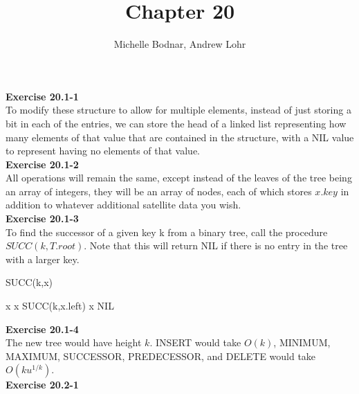 \documentclass{article}
\title{Chapter 20}
\author{Michelle Bodnar, Andrew Lohr}
\begin{document}
\maketitle


\noindent\textbf{Exercise 20.1-1}\\

To modify these structure to allow for multiple elements, instead of just storing a bit in each of the entries, we can store the head of a linked list representing how many elements of that value that are contained in the structure, with a NIL value to represent having no elements of that value.\\

\noindent\textbf{Exercise 20.1-2}\\

All operations will remain the same, except instead of the leaves of the tree being an array of integers, they will be an array of nodes, each of which stores $x.key$ in addition to whatever additional satellite data you wish.  \\


\noindent\textbf{Exercise 20.1-3}\\

To find the successor of a given key k from a binary tree, call the procedure $SUCC(k, T.root)$. Note that this will return NIL if there is no entry in the tree with a larger key.\\
\begin{algorithm}
\caption{ SUCC(k,x)}
\begin{algorithmic}
		\State \Return x
	\Else
			\State \Return x
		\Else 
			\State \Return SUCC(k,x.left)
		\EndIf
	\EndIf
\Else
		\State \Return x
	\Else
		\State \Return NIL
	\EndIf
\EndIf
\end{algorithmic}
\end{algorithm}


\noindent\textbf{Exercise 20.1-4}\\

The new tree would have height $k$.  INSERT would take $O(k)$, MINIMUM, MAXIMUM, SUCCESSOR, PREDECESSOR, and DELETE would take $O(ku^{1/k})$. \\

\noindent\textbf{Exercise 20.2-1}\\
\end{document}
